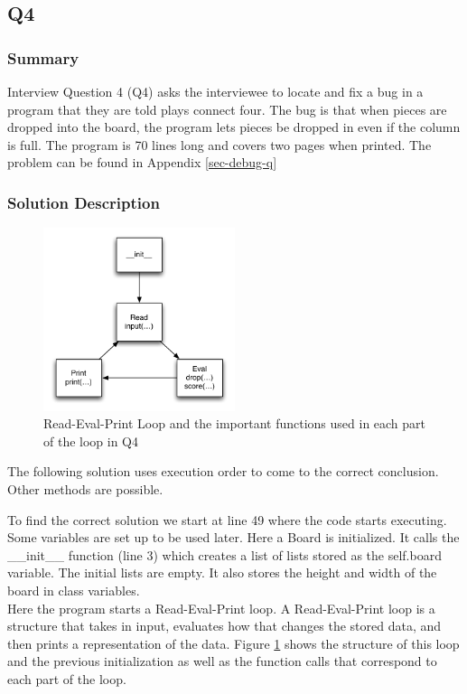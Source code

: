 \subsection{Q4}
\subsubsection{Summary}
Interview Question 4 (Q4) asks the interviewee to locate and fix a bug in a program that they are told plays connect four.
The bug is that when pieces are dropped into the board, the program lets pieces be dropped in even if the column is full.
The program is 70 lines long and covers two pages when printed.
The problem can be found in Appendix \ref{sec-debug-q}

\subsubsection{Solution Description}
\begin{figure}[t]
\centering
\includegraphics[width=0.5\textwidth]{Q4diagram.pdf}
\caption{Read-Eval-Print Loop and the important functions used in each part of the loop in Q4}
\label{fig-q2}
\end{figure}

The following solution uses execution order to come to the correct conclusion. Other methods are possible. 

To find the correct solution we start at line 49 where the code starts executing.
Some variables are set up to be used later. 
Here a Board is initialized.
It calls the \_\_init\_\_ function (line 3) which creates a list of lists stored as the self.board variable.
The initial lists are empty.
It also stores the height and width of the board in class variables. \\

Here the program starts a Read-Eval-Print loop. A Read-Eval-Print loop is a structure that takes in input, evaluates how that changes the stored data, and then prints a representation of the data. Figure \ref{fig-q2} shows the structure of this loop and the previous initialization as well as the function calls that correspond to each part of the loop.\\

